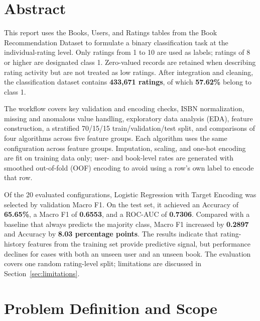 \documentclass[12pt,a4paper]{article}
\begin{document}
\section*{Abstract}
This report uses the Books, Users, and Ratings tables from the Book Recommendation Dataset to
formulate a binary classification task at the individual-rating level. Only ratings from 1 to 10
are used as labels; ratings of 8 or higher are designated class 1. Zero-valued records are retained
when describing rating activity but are not treated as low ratings. After integration and cleaning,
the classification dataset contains \textbf{433,671 ratings}, of which \textbf{57.62\%} belong to class 1.

The workflow covers key validation and encoding checks, ISBN normalization, missing and anomalous
value handling, exploratory data analysis (EDA), feature construction, a stratified 70/15/15
train/validation/test split, and comparisons of four algorithms across five feature groups. Each
algorithm uses the same configuration across feature groups. Imputation, scaling, and one-hot
encoding are fit on training data only; user- and book-level rates are generated with smoothed
out-of-fold (OOF) encoding to avoid using a row's own label to encode that row.

Of the 20 evaluated configurations, Logistic Regression with Target Encoding was selected by
validation Macro F1. On the test set, it achieved an Accuracy of \textbf{65.65\%}, a Macro F1 of
\textbf{0.6553}, and a ROC-AUC of \textbf{0.7306}. Compared with a baseline that always predicts the
majority class, Macro F1 increased by \textbf{0.2897} and Accuracy by \textbf{8.03 percentage points}.
The results indicate that rating-history features from the training set provide predictive signal,
but performance declines for cases with both an unseen user and an unseen book. The evaluation covers one random rating-level split; limitations are discussed in Section~\ref{sec:limitations}.

\clearpage
\begingroup
\footnotesize
{}
\setlength{\parskip}{0pt}
\tableofcontents
\endgroup
\clearpage
\listoffigures
\listoftables
\clearpage
{}

\section{Problem Definition and Scope}
\end{document}
